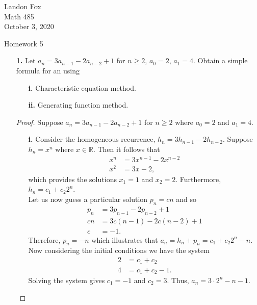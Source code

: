 \documentclass[ 12pt ]{article}
\begin{document}
\noindent Landon Fox \\
\noindent Math 485 \\
\noindent October 3, 2020

\begin{center}
	\Large Homework 5
\end{center}

\begin{enumerate}
	\item[\textbf{1.}] Let $a_n = 3a_{n-1} - 2a_{n-2} + 1$ for $n \geq 2$, $a_0 = 2$, $a_1 = 4$. Obtain a simple formula for an using
		\begin{enumerate}
			\item[\textbf{i.}] Characteristic equation method.
			\item[\textbf{ii.}] Generating function method.
		\end{enumerate}

		\begin{proof}
			Suppose $a_n = 3a_{n-1} - 2a_{n-2} + 1$ for $n \geq 2$ where $a_0 = 2$ and $a_1 = 4$.
			\begin{enumerate}
				\item[\textbf{i.}] Consider the homogeneous recurrence, $h_n = 3h_{n-1} - 2h_{n-2}$. Suppose $h_n = x^n$ where $x \in \mathbb{R}$. Then it follows that
					\begin{align*}
						x^n &= 3x^{n-1} - 2x^{n-2} \\
						x^2 &= 3x - 2,
					\end{align*}
					which provides the solutions $x_1 = 1$ and $x_2 = 2$. Furthermore, $h_n = c_1 + c_2 2^n$. \\

					Let us now guess a particular solution $p_n = cn$ and so
					\begin{align*}
						p_n &= 3p_{n-1} - 2p_{n-2} + 1 \\
						cn &= 3c(n-1) - 2c(n-2) + 1 \\
						c &= -1.
					\end{align*}
					Therefore, $p_n = -n$ which illustrates that $a_n = h_n + p_n = c_1 + c_2 2^n - n$. Now considering the initial conditions we have the system
					\begin{align*}
						2 &= c_1 + c_2 \\
						4 &= c_1 + c_2 - 1.
					\end{align*}
					Solving the system gives $c_1 = -1$ and $c_2 = 3$. Thus, $a_n = 3 \cdot 2^n - n -1$.


\end{enumerate}
\end{proof}
\end{enumerate}
\end{document}
